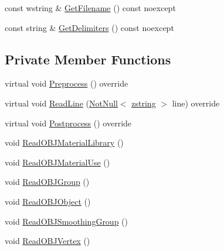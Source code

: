 \begin{DoxyCompactItemize}
\item 
const wstring \& \mbox{\hyperlink{classmage_1_1rendering_1_1loader_1_1_o_b_j_reader_a682ed8030c99a62d4409a01f9efa6d6b}{Get\+Filename}} () const noexcept
\item 
const string \& \mbox{\hyperlink{classmage_1_1rendering_1_1loader_1_1_o_b_j_reader_aa00e1e27b614e11ec9f70e52d0bac551}{Get\+Delimiters}} () const noexcept
\end{DoxyCompactItemize}
\subsection*{Private Member Functions}
\begin{DoxyCompactItemize}
\item 
virtual void \mbox{\hyperlink{classmage_1_1rendering_1_1loader_1_1_o_b_j_reader_ad082a6295259f7e8af2c60c182ea55d3}{Preprocess}} () override
\item 
virtual void \mbox{\hyperlink{classmage_1_1rendering_1_1loader_1_1_o_b_j_reader_a6552753d2295585283df035732f38dbd}{Read\+Line}} (\mbox{\hyperlink{namespacemage_a8769f9d670d6b585ea306cb1062af94b}{Not\+Null}}$<$ \mbox{\hyperlink{namespacemage_a4163ec9a9a27d5e7f4b452dcb99cb2b9}{zstring}} $>$ line) override
\item 
virtual void \mbox{\hyperlink{classmage_1_1rendering_1_1loader_1_1_o_b_j_reader_a281c16ef7d20a7c1416923f3cadee33a}{Postprocess}} () override
\item 
void \mbox{\hyperlink{classmage_1_1rendering_1_1loader_1_1_o_b_j_reader_aa898eb5cac6a5e04b1da9329587a81cd}{Read\+O\+B\+J\+Material\+Library}} ()
\item 
void \mbox{\hyperlink{classmage_1_1rendering_1_1loader_1_1_o_b_j_reader_a5aa719224a08175bcbcb26873e2fb5e1}{Read\+O\+B\+J\+Material\+Use}} ()
\item 
void \mbox{\hyperlink{classmage_1_1rendering_1_1loader_1_1_o_b_j_reader_a4e733a0afea4b82e3aea89fe58f5bfba}{Read\+O\+B\+J\+Group}} ()
\item 
void \mbox{\hyperlink{classmage_1_1rendering_1_1loader_1_1_o_b_j_reader_a519f333ce13777d469c63eae7ab8dcf4}{Read\+O\+B\+J\+Object}} ()
\item 
void \mbox{\hyperlink{classmage_1_1rendering_1_1loader_1_1_o_b_j_reader_ac7f3807cf0a0ae24b340cb8208c5b2ef}{Read\+O\+B\+J\+Smoothing\+Group}} ()
\item 
void \mbox{\hyperlink{classmage_1_1rendering_1_1loader_1_1_o_b_j_reader_a0f6e0d744b2baf94bca4dfda6c2cc194}{Read\+O\+B\+J\+Vertex}} ()
\item 

\end{DoxyCompactItemize}
